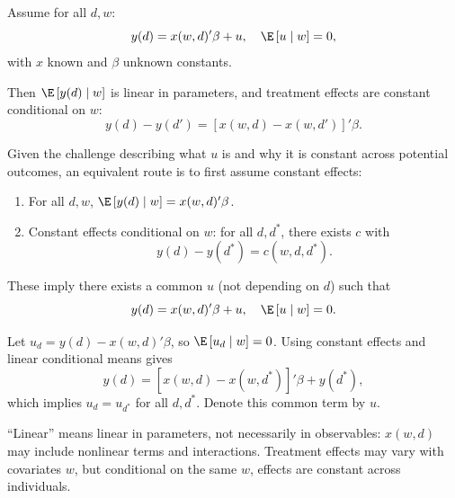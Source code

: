 \begin{proposition}
	Assume for all $d,w$: \[
		y(d)=x(w,d)'\beta + u, \quad \E\left[u \mid w\right]=0
	,\]
	with $x$ known and $\beta$ unknown constants.

	Then $\E\left[y(d)\mid w\right]$ is linear in parameters, and treatment effects are constant conditional on $w$: \[
		y(d)-y(d') = \left[x(w,d)-x(w,d')\right]'\beta
	.\]
\end{proposition}

\begin{remark}
	Given the challenge describing what $u$ is and why it is constant across potential outcomes, an equivalent route is to first assume constant effects:
	\begin{enumerate}[label=(\roman*)]
		\item For all $d,w$, $\E\left[y(d)\mid w\right] = x(w,d)'\beta$.
		\item Constant effects conditional on $w$: for all $d,d^*$, there exists $c$ with \[
			y(d)-y(d^*) = c(w,d,d^*)
		.\]
	\end{enumerate}
	These imply there exists a common $u$ (not depending on $d$) such that \[
		y(d)=x(w,d)'\beta + u, \quad \E\left[u\mid w\right]=0
	.\]
\end{remark}

\begin{remark}
	Let $u_d = y(d)-x(w,d)'\beta$, so $\E\left[u_d \mid w\right]=0$. Using constant effects and linear conditional means gives \[
		y(d)=\left[x(w,d)-x(w,d^*)\right]'\beta + y(d^*)
	,\]
	which implies $u_d=u_{d^*}$ for all $d,d^*$. Denote this common term by $u$.
\end{remark}

\begin{remark}[Interpretation]
	``Linear'' means linear in parameters, not necessarily in observables: $x(w,d)$ may include nonlinear terms and interactions. Treatment effects may vary with covariates $w$, but conditional on the same $w$, effects are constant across individuals.
\end{remark}

